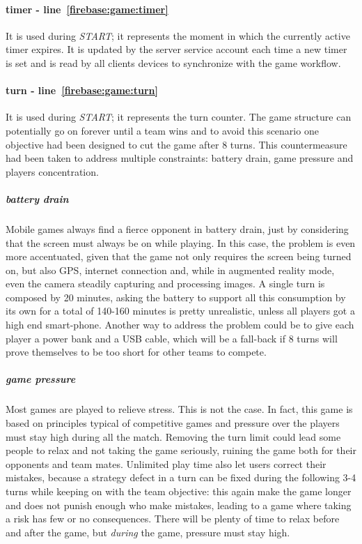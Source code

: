 				\paragraph{timer - line~\ref{firebase:game:timer}}
				It is used during \emph{START}; it represents the moment in which the currently active timer expires. It is updated by the server service account each time a new timer is set and is read by all clients devices to synchronize with the game workflow.
				
				\paragraph{turn - line~\ref{firebase:game:turn}}
				It is used during \emph{START}; it represents the turn counter. The game structure can potentially go on forever until a team wins and to avoid this scenario one objective had been designed to cut the game after 8 turns.
				This countermeasure had been taken to address multiple constraints: battery drain, game pressure and players concentration.
				
				\subparagraph{battery drain}
				Mobile games always find a fierce opponent in battery drain, just by considering that the screen must always be on while playing.
				In this case, the problem is even more accentuated, given that the game not only requires the screen being turned on, but also GPS, internet connection and, while in augmented reality mode, even the camera steadily capturing and processing images.
				A single turn is composed by 20 minutes, asking the battery to support all this consumption by its own for a total of 140-160 minutes is pretty unrealistic, unless all players got a high end smart-phone.
				Another way to address the problem could be to give each player a power bank and a USB cable, which will be a fall-back if 8 turns will prove themselves to be too short for other teams to compete.
				
				\subparagraph{game pressure}
				Most games are played to relieve stress. This is not the case. In fact, this game is based on principles typical of competitive games and pressure over the players must stay high during all the match. Removing the turn limit could lead some people to relax and not taking the game seriously, ruining the game both for their opponents and team mates.
				Unlimited play time also let users correct their mistakes, because a strategy defect in a turn can be fixed during the following 3-4 turns while keeping on with the team objective: this again make the game longer and does not punish enough who make mistakes, leading to a game where taking a risk has few or no consequences.
				There will be plenty of time to relax before and after the game, but \emph{during} the game, pressure must stay high.
				
